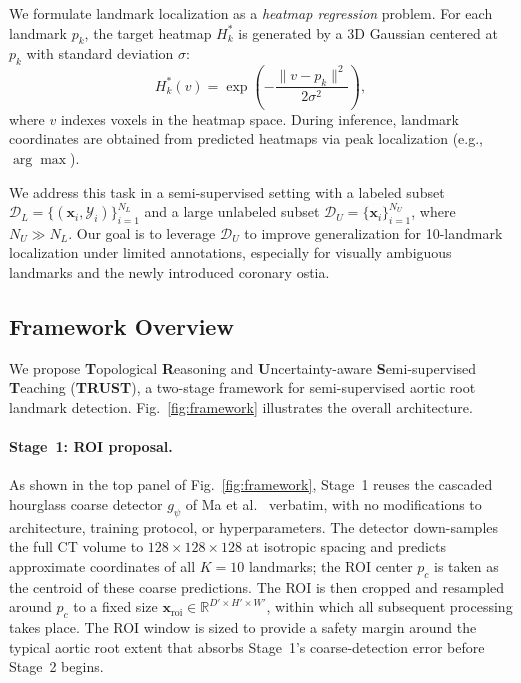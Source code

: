 \documentclass[conference]{IEEEtran}
\begin{document}
We formulate landmark localization as a \emph{heatmap regression} problem. For each landmark $p_k$, the target heatmap $H_k^{*}$ is generated by a 3D Gaussian centered at $p_k$ with standard deviation $\sigma$:
\begin{equation}
H_k^{*}(v) = \exp\left(-\frac{\|v - p_k\|^2}{2\sigma^2}\right),
\label{eq:heatmap}
\end{equation}
where $v$ indexes voxels in the heatmap space. During inference, landmark coordinates are obtained from predicted heatmaps via peak localization (e.g., $\arg\max$).

We address this task in a semi-supervised setting with a labeled subset $\mathcal{D}_L = \{(\mathbf{x}_i, \mathcal{Y}_i)\}_{i=1}^{N_L}$ and a large unlabeled subset $\mathcal{D}_U = \{\mathbf{x}_i\}_{i=1}^{N_U}$, where $N_U \gg N_L$. Our goal is to leverage $\mathcal{D}_U$ to improve generalization for 10-landmark localization under limited annotations, especially for visually ambiguous landmarks and the newly introduced coronary ostia.

\subsection{Framework Overview}
\label{sec:overview}

We propose \textbf{T}opological \textbf{R}easoning and \textbf{U}ncertainty-aware \textbf{S}emi-supervised \textbf{T}eaching (\textbf{TRUST}), a two-stage framework for semi-supervised aortic root landmark detection. Fig.~\ref{fig:framework} illustrates the overall architecture.

\paragraph{Stage~1: ROI proposal.}
As shown in the top panel of Fig.~\ref{fig:framework}, Stage~1 reuses the cascaded hourglass coarse detector $g_\psi$ of Ma et al.~\cite{Ma2023_aortic_landmarks} verbatim, with no modifications to architecture, training protocol, or hyperparameters. The detector down-samples the full CT volume to $128\times 128\times 128$ at isotropic spacing and predicts approximate coordinates of all $K=10$ landmarks; the ROI center $p_c$ is taken as the centroid of these coarse predictions. The ROI is then cropped and resampled around $p_c$ to a fixed size $\mathbf{x}_{\mathrm{roi}} \in \mathbb{R}^{D' \times H' \times W'}$, within which all subsequent processing takes place. The ROI window is sized to provide a safety margin around the typical aortic root extent that absorbs Stage~1's coarse-detection error before Stage~2 begins.
\end{document}
